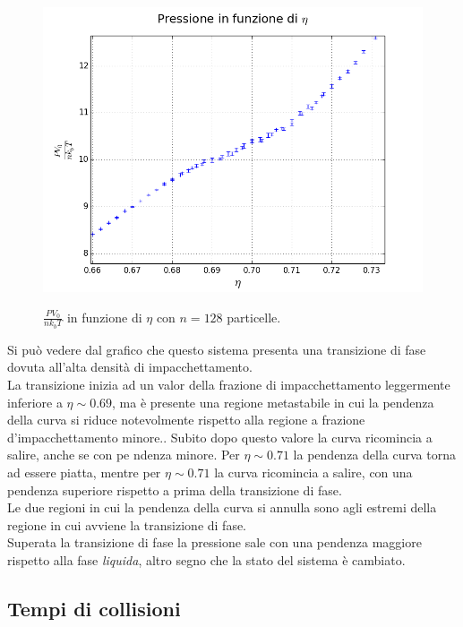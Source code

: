 \begin{figure}[ht]
{	\includegraphics[scale=0.48]{sfere2D/pressionzoomzoom.png}
	}
	\caption{ $\frac{P V_0}{n k_{b} T}$ in funzione di $\eta$ con $n=128$ particelle.}
	\end{figure}
Si può vedere dal grafico che questo sistema presenta una transizione di fase dovuta all'alta densità di impacchettamento.\\
La transizione inizia ad un valor della frazione di impacchettamento leggermente inferiore a $\eta \sim 0.69$, ma è presente una regione metastabile in cui la pendenza della curva si riduce notevolmente rispetto alla regione a frazione d'impacchettamento minore..
Subito dopo questo valore la curva ricomincia a salire, anche se con pe	ndenza minore.
Per $\eta \sim 0.71$ la pendenza della curva torna ad essere piatta, mentre per $\eta \sim 0.71$ la curva ricomincia a salire, con una pendenza superiore rispetto a prima della transizione di fase.\\
Le due regioni in cui la pendenza della curva si annulla sono agli estremi della regione in cui avviene la transizione di fase.\\
Superata la transizione di fase la pressione sale con una pendenza maggiore rispetto alla fase \emph{liquida}, altro segno che la stato del sistema è cambiato.



\subsection{Tempi di collisioni}

